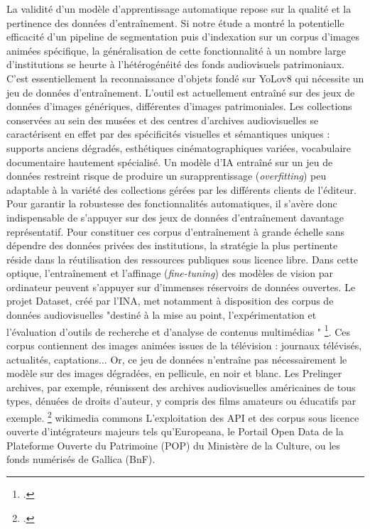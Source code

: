 La validité d'un modèle d'apprentissage automatique repose sur la qualité et la pertinence des données d'entraînement. Si notre étude a montré la potentielle efficacité d'un pipeline de segmentation puis d'indexation sur un corpus d'images animées spécifique, la généralisation de cette fonctionnalité à un nombre large d'institutions se heurte à l'hétérogénéité des fonds audiovisuels patrimoniaux. 
C'est essentiellement la reconnaissance d'objets fondé sur YoLov8 qui nécessite un jeu de données d'entraînement. L'outil est actuellement entraîné sur des jeux de données d'images génériques, différentes d'images patrimoniales. Les collections conservées au sein des musées et des centres d'archives audiovisuelles se caractérisent en effet par des spécificités visuelles et sémantiques uniques : supports anciens dégradés, esthétiques cinématographiques variées, vocabulaire documentaire hautement spécialisé. Un modèle d'IA entraîné sur un jeu de données restreint risque de produire un surapprentissage (\textit{overfitting}) peu adaptable à la variété des collections gérées par les différents clients de l'éditeur. Pour garantir la robustesse des fonctionnalités automatiques, il s'avère donc indispensable de s'appuyer sur des jeux de données d'entraînement davantage représentatif.
Pour constituer ces corpus d'entraînement à grande échelle sans dépendre des données privées des institutions, la stratégie la plus pertinente réside dans la réutilisation des ressources publiques sous licence libre. 
Dans cette optique, l'entraînement et l'affinage (\textit{fine-tuning}) des modèles de vision par ordinateur peuvent s'appuyer sur d'immenses réservoirs de données ouvertes. Le projet Dataset, créé par l'INA, met notamment à disposition des corpus de données audiovisuelles  "destiné à la mise au point, l’expérimentation et l’évaluation d’outils de recherche et d’analyse de contenus multimédias " \footcite{zotero-item-754}. Ces corpus contiennent des images animées issues de la télévision : journaux télévisés, actualités, captations... Or, ce jeu de données n'entraîne pas nécessairement le modèle sur des images dégradées, en pellicule, en noir et blanc. 
Les Prelinger archives, par exemple, réunissent des archives audiovisuelles américaines de tous types, dénuées de droits d'auteur, y compris des films amateurs ou éducatifs par exemple. \footcite{zotero-item-756}
wikimedia commons 
L'exploitation des API et des corpus sous licence ouverte d'intégrateurs majeurs tels qu'Europeana, le Portail Open Data de la Plateforme Ouverte du Patrimoine (POP) du Ministère de la Culture, ou les fonds numérisés de Gallica (BnF).

